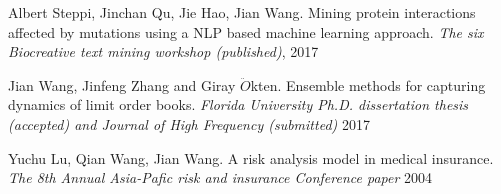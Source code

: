 \begin{cventries}
  \cventry
    {}
    {}
    {}
    {}
    {
      \begin{cvitems}
        \item {Albert Steppi, Jinchan Qu, Jie Hao, Jian Wang. Mining protein interactions affected by mutations using a NLP based
        machine learning approach. \textit{The six Biocreative text mining workshop (published)}, 2017}
        \item {Jian Wang, Jinfeng Zhang and Giray $\ddot{O}$kten. Ensemble methods for capturing dynamics of limit order books. \textit{Florida
        University Ph.D. dissertation thesis (accepted) and Journal of High Frequency (submitted)} 2017}
        \item {Yuchu Lu, Qian Wang, Jian Wang. A risk analysis model in medical insurance. \textit{The 8th Annual Asia-Pafic risk and
        insurance Conference paper} 2004}
      \end{cvitems}
    }
\end{cventries}